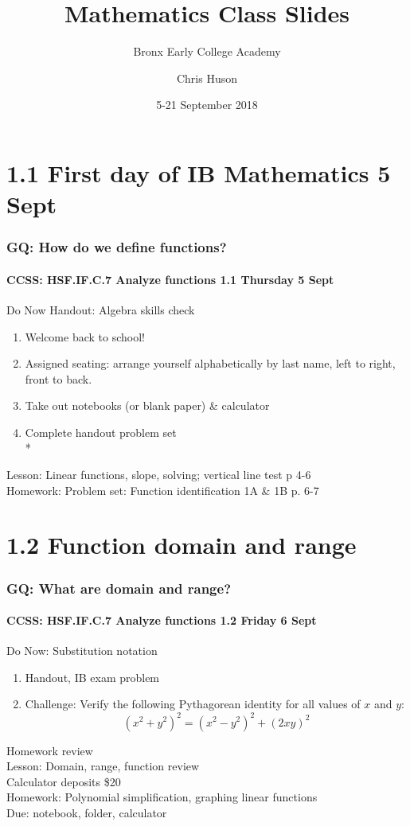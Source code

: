 \documentclass{beamer}
\title{Mathematics Class Slides}
\subtitle{Bronx Early College Academy}
\author{Chris Huson}
\date{5-21 September 2018}
\begin{document}
\frame{\titlepage}
\section[Outline]{}
\frame{\tableofcontents}

  \section{1.1 First day of IB Mathematics 5 Sept}
  \frame
  {
    \frametitle{GQ: How do we define functions?}
    \framesubtitle{CCSS: HSF.IF.C.7 Analyze functions \hfill \alert{1.1 Thursday 5 Sept}}

    \begin{block}{Do Now Handout: Algebra skills check}
    \begin{enumerate}
        \item Welcome back to school!
        \item Assigned seating: arrange yourself alphabetically by last name, left to right, front to back.
        \item Take out notebooks (or blank paper) \& calculator
        \item Complete handout problem set\\*
    \end{enumerate}
    \end{block}
    Lesson: Linear functions, slope, solving; vertical line test p 4-6 \\%
    Homework: Problem set: Function identification 1A \& 1B p. 6-7
  }

  \section{1.2 Function domain and range}
  \frame
  {
    \frametitle{GQ: What are domain and range?}
    \framesubtitle{CCSS: HSF.IF.C.7 Analyze functions \hfill \alert{1.2 Friday 6 Sept}}

    \begin{block}{Do Now: Substitution notation}
    \begin{enumerate}
      \item Handout, IB exam problem
      \item Challenge: %
        Verify the following Pythagorean identity for all values of $x$ and $y$:
        \[(x^2+y^2)^2=(x^2-y^2)^2+(2xy)^2\]
    \end{enumerate}
    \end{block}
    Homework review\\
    Lesson: Domain, range, function review\\[5pt]
    Calculator deposits \$20
    \\[5pt]
    Homework: Polynomial simplification, graphing linear functions\\
    Due: notebook, folder, calculator
  }
\end{document}
